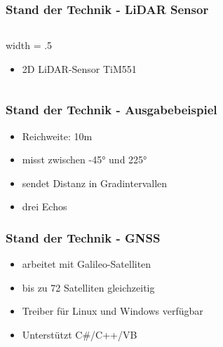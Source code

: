 \documentclass{beamer}
\begin{document}
\begin{frame}
\frametitle{Stand der Technik - LiDAR Sensor}
\begin{columns}
\begin{column}{width = .5\textwidth}
	\begin{itemize}
		\item<1-> 2D LiDAR-Sensor TiM551
	\end{itemize}
\end{column}
	\begin{column}
	\end{column}
\end{columns}
\end{frame}

\begin{frame}
\frametitle{Stand der Technik - Ausgabebeispiel}
\begin{itemize}
\item<1-> Reichweite: 10m 
\item<2-> misst zwischen -45° und 225°
\item<3-> sendet Distanz in Gradintervallen
\item<4> drei Echos
\end{itemize}
\end{frame}

\begin{frame}
\frametitle{Stand der Technik - GNSS}
\begin{itemize}
\item<1-> arbeitet mit Galileo-Satelliten
\item<2-> bis zu 72 Satelliten gleichzeitig
\item<3-> Treiber für Linux und Windows verfügbar
\item<4> Unterstützt C\#/C++/VB
\end{itemize}
\end{frame}
\end{document}
